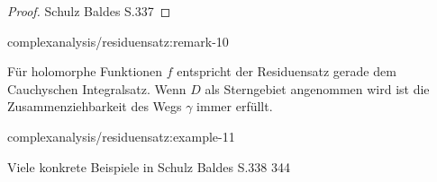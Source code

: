 \begin{proof}
 Schulz Baldes S.337
\end{proof}
\begin{remark}{}{complexanalysis/residuensatz:remark-10}



\par
Für holomorphe Funktionen \(f\) entspricht der Residuensatz gerade dem Cauchyschen Integralsatz.
Wenn \(D\) als Sterngebiet angenommen wird ist die Zusammenziehbarkeit des Wegs \(\gamma\) immer erfüllt.
\end{remark}
\begin{example}{}{complexanalysis/residuensatz:example-11}



\par
Viele konkrete Beispiele in Schulz Baldes S.338 344
\end{example}


